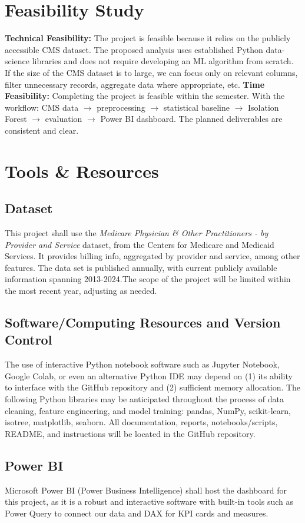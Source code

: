 \documentclass[12pt]{article}
\begin{document}
\section{Feasibility Study}
\textbf{Technical Feasibility:} The project is feasible because it relies on the publicly accessible CMS dataset. The proposed analysis uses established Python data-science libraries and does not require developing an ML algorithm from scratch. If the size of the CMS dataset is to large, we can focus only on relevant columns, filter unnecessary records, aggregate data where appropriate, etc.
\textbf{Time Feasibility:} Completing the project is feasible within the semester. With the workflow: CMS data $\rightarrow$ preprocessing $\rightarrow$ statistical baseline $\rightarrow$ Isolation Forest $\rightarrow$ evaluation $\rightarrow$ Power BI dashboard. The planned deliverables are consistent and clear.

\section{Tools \& Resources}
\subsection*{Dataset}
This project shall use the \textit{Medicare Physician \& Other Practitioners - by Provider and Service} dataset, from the Centers for Medicare and Medicaid Services. It provides billing info, aggregated by provider and service, among other features. The data set is published annually, with current publicly available information spanning 2013-2024.The scope of the project will be limited within the most recent year, adjusting as needed.
\subsection*{Software/Computing Resources and Version Control}
The use of interactive Python notebook software such as Jupyter Notebook, Google Colab, or even an alternative Python IDE may depend on (1) its ability to interface with the GitHub repository and (2) sufficient memory allocation. The following Python libraries may be anticipated throughout the process of data cleaning, feature engineering, and model training: pandas, NumPy, scikit-learn, isotree, matplotlib, seaborn. All documentation, reports, notebooks/scripts, README, and instructions will be located in the GitHub repository.
\subsection*{Power BI}
Microsoft Power BI (Power Business Intelligence) shall host the dashboard for this project, as it is a robust and interactive software with built-in tools such as Power Query to connect our data and DAX for KPI cards and measures. 
\end{document}
